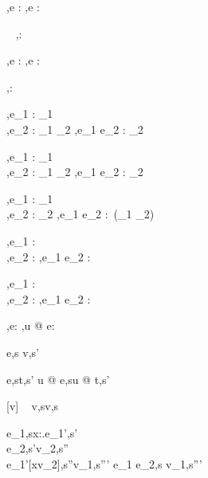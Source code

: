  {\Gamma,\Sigma \infers e : \tau}
  {\Gamma,\Sigma \infers \Edit e : \Task \tau}

  {\ }
  {\Gamma,\Sigma \infers \Enter \tau : \Task \tau}

  {\Gamma,\Sigma \infers e : \Reference \tau}
  {\Gamma,\Sigma \infers \Update e : \Task \tau}


  { }
  {\Gamma,\Sigma \infers \Fail : \Task \tau}


  {\Gamma,\Sigma \infers e_1 : \Task \tau_1 \\
   \Gamma,\Sigma \infers e_2 : \tau_1 \to \Task \tau_2}
  {\Gamma,\Sigma \infers e_1 \Then e_2 : \Task \tau_2}


  {\Gamma,\Sigma \infers e_1 : \Task \tau_1 \\
   \Gamma,\Sigma \infers e_2 : \tau_1 \to \Task \tau_2}
  {\Gamma,\Sigma \infers e_1 \Next e_2 : \Task \tau_2}


  {\Gamma,\Sigma \infers e_1 : \Task \tau_1 \\
   \Gamma,\Sigma \infers e_2 : \Task \tau_2}
  {\Gamma,\Sigma \infers e_1 \And e_2 : \Task\,(\tau_1 \times \tau_2)}


  {\Gamma,\Sigma \infers e_1 : \Task \tau \\
   \Gamma,\Sigma \infers e_2 : \Task \tau }
  {\Gamma,\Sigma \infers e_1 \Or e_2 : \Task \tau}


  {\Gamma,\Sigma \infers e_1 : \Task \tau \\
   \Gamma,\Sigma \infers e_2 : \Task \tau }
  {\Gamma,\Sigma \infers e_1 \Xor e_2 : \Task \tau}

  {\Gamma,\Sigma\infers e:\Task\tau}
  {\Gamma,\Sigma\infers u @ e:\Task\tau}





  {e,s \evaluate v,s'}

    {e,s\evaluate t,s'}
    {u @ e,s\evaluate u @ t,s'}

[v\in{}]
  {\ }
  {v,s\evaluate v,s}

  {e_1,s\evaluate \lambda x:\tau.e_1',s'\\
   e_2,s'\evaluate v_2,s''\\
   e_1'[x\mapsto v_2],s''\evaluate v_1,s'''}
  {e_1 e_2,s \evaluate v_1,s'''}

